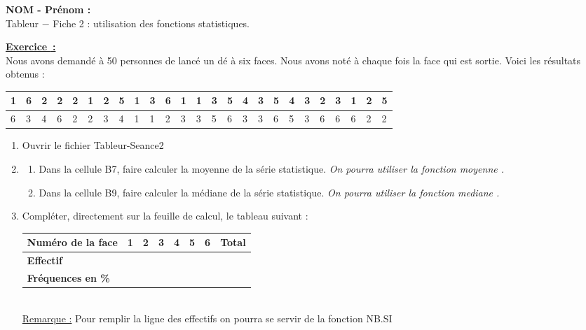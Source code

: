 \documentclass[12pt,a4paper]{article}
\newcommand{\ent}[2]{\par \noindent \textbf{NOM - Prénom :} \dotfill \vspace{9pt} \\ Tableur $-$ Fiche #1 : #2.}
\newcounter {exercice}
\newcommand{\Exdeb}{\par \noindent \stepcounter{exercice} \textbf{\underline{{Exercice }\theexercice\,: }}\vspace{3 pt}}
\begin{document}
\ent{2}{utilisation des fonctions statistiques} \vspace{24 pt}
\Exdeb \\
Nous avons demandé à 50 personnes de lancé un dé à six faces. Nous avons noté à chaque fois la face qui est sortie. Voici les résultats obtenus : \vspace{3pt} \\
\renewcommand{\arraystretch}{1.5}
\begin{tabular}{|l|l|l|l|l|l|l|l|l|l|l|l|l|l|l|l|l|l|l|l|l|l|l|l|l|}
\hline
1&6&2&2&2&1&2&5&1&3&6&1&1&3&5&4&3&5&4&3&2&3&1&2&5\\
\hline
6&3&4&6&2&2&3&4&1&1&2&3&3&5&6&3&3&6&5&3&6&6&6&2&2\\
\hline
\end{tabular} \vspace{6pt} 
\begin{enumerate}[1{)}]
\item
Ouvrir le fichier Tableur-Seance2
\item
\begin{enumerate}[a{)}]
\item
Dans la cellule B7, faire calculer la moyenne de la série statistique. \textit{On pourra utiliser la fonction \og moyenne \fg{}.}
\item
Dans la cellule B9, faire calculer la médiane de la série statistique. \textit{On pourra utiliser la fonction \og mediane \fg{}.}
\end{enumerate}
\item
Compléter, directement sur la feuille de calcul, le tableau suivant : \vspace{3pt} \\
\renewcommand{\arraystretch}{1.5}
\begin{tabular}{|l|>{\centering}p{1cm}|>{\centering}p{1cm}|>{\centering}p{1cm}|>{\centering}p{1cm}|>{\centering}p{1cm}|>{\centering}p{1cm}|l|}
\hline
\textbf{Numéro de la face}&\textbf{1}&\textbf{2}&\textbf{3}&\textbf{4}&\textbf{5}&\textbf{6}&\textbf{Total}\\
\hline
\textbf{Effectif}&&&&&&&\\
\hline
\textbf{Fréquences en \%}&&&&&&&\\
\hline
\end{tabular}
\vspace{12pt} \\
\underline{Remarque :} Pour remplir la ligne des effectifs on pourra se servir de la fonction NB.SI
\vspace{9pt} \\

\end{enumerate}
\end{document}
